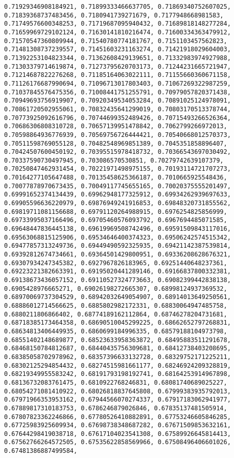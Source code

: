 \documentclass[11pt]{article}
\begin{document}
\begin{Verbatim}[commandchars=\\\{\}]
0.71929346908184921, 0.71899333466637705, 0.71869340752607025, 0.71839368737483456, 0.7180941739271679, 0.7177948668981583, 0.71749576600348253, 0.71719687095940432, 0.71689818148277284, 0.71659969729102124, 0.71630141810216474, 0.71600334363479912, 0.71570547360809944, 0.71540780774181767, 0.7151103457562823, 0.71481308737239557, 0.71451603231163274, 0.71421918029604003, 0.71392253104823344, 0.71362608429139651, 0.71332983974927988, 0.71303379714619874, 0.71273795620703173, 0.71244231665721947, 0.71214687822276268, 0.71185164063022111, 0.71155660360671158, 0.71126176687990694, 0.71096713017803403, 0.71067269322987259, 0.71037845576475356, 0.71008441751255791, 0.70979057820371438, 0.70949693756919907, 0.70920349534053284, 0.70891025124978091, 0.70861720502955061, 0.70832435641299019, 0.70803170513378744, 0.70773925092616796, 0.70744699352489426, 0.70715493266526364, 0.70686306808310728, 0.70657139951478842, 0.7062799266972013, 0.70598864936776939, 0.70569756726444421, 0.70540668012570373, 0.70511598769055128, 0.70482548969851389, 0.7045351858896407, 0.70424507600450192, 0.70395515978418732, 0.70366543697030492, 0.70337590730497945, 0.703086570530851, 0.70279742639107379, 0.70250847462931454, 0.70221971498975155, 0.70193114721707273, 0.70164277105647488, 0.70135458625366187, 0.7010665925548436, 0.70077878970673435, 0.70049117745655165, 0.70020375555201497, 0.69991652374134439, 0.69962948177325912, 0.69934262939697633, 0.69905596636220979, 0.69876949241916853, 0.69848320731855562, 0.69819711081156688, 0.69791120264988915, 0.6976254825856999, 0.69733995037166496, 0.69705460576093792, 0.6967694485071585, 0.69648447836445138, 0.69619969508742496, 0.69591509843117016, 0.69563068815125906, 0.69534646400374323, 0.69506242574515342, 0.69477857313249736, 0.69449490592325935, 0.69421142387539814, 0.69392812674734661, 0.69364501429800951, 0.69336208628676321, 0.69307934247345382, 0.6927967826183965, 0.69251440648237361, 0.69223221382663391, 0.69195020441289146, 0.69166837800332381, 0.69138673436057152, 0.69110527324773663, 0.69082399442838138, 0.6905428976665271, 0.69026198272665307, 0.68998124937369532, 0.68970069737304529, 0.68942032649054907, 0.68914013649250561, 0.68886012714566625, 0.6885802982172331, 0.68830064947485758, 0.6880211806866402, 0.68774189162112864, 0.68746278204731681, 0.68718385173464358, 0.68690510045299225, 0.68662652797268831, 0.68634813406449935, 0.6860699184996335, 0.68579188104973798, 0.68551402148689877, 0.68523633958363872, 0.68495883511291678, 0.68468150784812687, 0.68440435756309681, 0.68412738403208695, 0.68385058702978962, 0.68357396633132728, 0.68329752171225211, 0.68302125294854432, 0.68274515981661177, 0.68246924209328819, 0.68219349955583242, 0.68191793198192741, 0.68164253914967898, 0.68136732083761475, 0.6810922768246831, 0.68081740689025227, 0.68054271081410922, 0.68026818837645808, 0.67999383935792013, 0.67971966353953162, 0.67944566070274337, 0.67917183062941977, 0.67889817310183753, 0.6786246879026846, 0.67835137481505914, 0.67807823362246866, 0.67780526410882891, 0.67753246605846285, 0.67725983925609934, 0.67698738348687282, 0.67671509853632161, 0.67644298419038718, 0.67617104023541308, 0.67589926645814413, 0.67562766264572505, 0.67535622858569966, 0.67508496406601026, 0.67481386887499584, 
\end{Verbatim}
\end{document}
